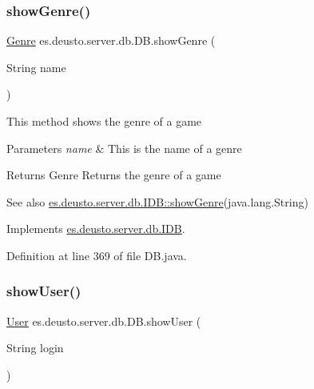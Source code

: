 \subsubsection{\texorpdfstring{show\+Genre()}{showGenre()}}
{\footnotesize\ttfamily \hyperlink{classes_1_1deusto_1_1server_1_1db_1_1data_1_1_genre}{Genre} es.\+deusto.\+server.\+db.\+D\+B.\+show\+Genre (\begin{DoxyParamCaption}\item[{String}]{name }\end{DoxyParamCaption})}

This method shows the genre of a game 
\begin{DoxyParams}{Parameters}
{\em name} & This is the name of a genre \\
\hline
\end{DoxyParams}
\begin{DoxyReturn}{Returns}
Genre Returns the genre of a game 
\end{DoxyReturn}
\begin{DoxySeeAlso}{See also}
\hyperlink{interfacees_1_1deusto_1_1server_1_1db_1_1_i_d_b_a9023bdad77781d95fc2e556d1935f763}{es.\+deusto.\+server.\+db.\+I\+D\+B\+::show\+Genre}(java.\+lang.\+String) 
\end{DoxySeeAlso}


Implements \hyperlink{interfacees_1_1deusto_1_1server_1_1db_1_1_i_d_b_a9023bdad77781d95fc2e556d1935f763}{es.\+deusto.\+server.\+db.\+I\+DB}.



Definition at line 369 of file D\+B.\+java.

\mbox{\label{classes_1_1deusto_1_1server_1_1db_1_1_d_b_ac85523faea523033439a932bbcab2c7e}} 
\subsubsection{\texorpdfstring{show\+User()}{showUser()}}
{\footnotesize\ttfamily \hyperlink{classes_1_1deusto_1_1server_1_1db_1_1data_1_1_user}{User} es.\+deusto.\+server.\+db.\+D\+B.\+show\+User (\begin{DoxyParamCaption}\item[{String}]{login }\end{DoxyParamCaption})}

